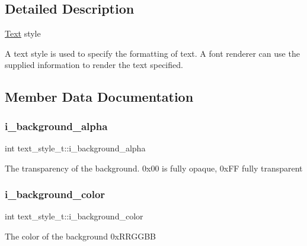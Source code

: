 \subsection{Detailed Description}
\hyperlink{classText}{Text} style

A text style is used to specify the formatting of text. A font renderer can use the supplied information to render the text specified. 

\subsection{Member Data Documentation}
\mbox{\label{structtext__style__t_a230dca3f2b2aeebccf9cd913354cb8d1}} 
\subsubsection{\texorpdfstring{i\+\_\+background\+\_\+alpha}{i\_background\_alpha}}
{\footnotesize\ttfamily int text\+\_\+style\+\_\+t\+::i\+\_\+background\+\_\+alpha}

The transparency of the background. 0x00 is fully opaque, 0x\+FF fully transparent \mbox{\label{structtext__style__t_ade4abd12624ab5c6c494df602e6c09bf}} 
\subsubsection{\texorpdfstring{i\+\_\+background\+\_\+color}{i\_background\_color}}
{\footnotesize\ttfamily int text\+\_\+style\+\_\+t\+::i\+\_\+background\+\_\+color}

The color of the background 0x\+R\+R\+G\+G\+BB \mbox{\label{structtext__style__t_a9c75b8f8809919db291b007fa6e931ee}} 
